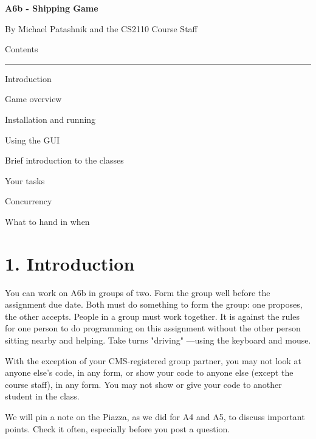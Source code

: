 \documentclass[11pt]{article}
\begin{document}
\lstset{language=Java}
\begin{center}
\begin{HUGE}{\bf A6b - Shipping Game}\\ \end{HUGE}
\vspace{3mm}
\begin{LARGE} By Michael Patashnik and the CS2110 Course Staff\\ \end{LARGE}
\vspace{7mm}
\begin{LARGE} Contents\\ \end{LARGE}
\noindent\rule{8cm}{0.4pt}
\begin{enumerate} \begin{large}
\item Introduction\item Game overview
\item Installation and running
\item Using the GUI
\item Brief introduction to the classes
\item Your tasks
\item Concurrency
\item What to hand in when
\end{large}\end{enumerate}
\end{center}


\section{1. Introduction}
You can work on A6b in groups of two. Form the group well before the assignment due date. Both must do something to form the group:
one proposes, the other accepts.
People in a group must work together. It is against the rules for one person to do programming on this assignment
without the other person sitting nearby and helping. Take turns "driving" ---using the keyboard and mouse.

With the exception of your CMS-registered group partner, you may not look at anyone else's code, in any form,
or show your code to anyone else (except the course staff), in any form. You may not show or give your code to another
student in the class.

We will pin a note on the Piazza, as we did for A4 and A5, to discuss important points. Check it often, especially before you post a question.
\end{document}
